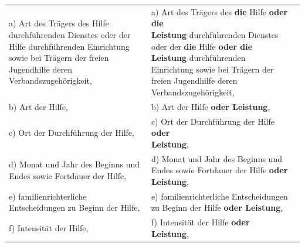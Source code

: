 \documentclass[10pt,a4paper,landscape]{article}
\begin{document}
\begin{longtable}{|L{8.2cm}|L{8.2cm}|L{8.2cm}|}
\hhline{|---|}
a)   \newline Art des Trägers des Hilfe durchführenden  \newline Dienstes oder der Hilfe durchführenden  \newline Einrichtung sowie bei Trägern der freien  \newline Jugendhilfe deren Verbandszugehörigkeit, & a)   \newline Art des Trägers des \textbf{\textcolor{diffred}{die}} Hilfe \textbf{\textcolor{diffred}{oder die  \newline Leistung}} durchführenden Dienstes oder  \newline der \textbf{\textcolor{diffred}{die}} Hilfe \textbf{\textcolor{diffred}{oder die Leistung}}  \newline durchführenden Einrichtung sowie bei  \newline Trägern der freien Jugendhilfe deren  \newline Verbandszugehörigkeit, &  \\
\hhline{|---|}
b)   \newline Art der Hilfe, & b)   \newline Art der Hilfe \textbf{\textcolor{diffred}{oder Leistung}}, &  \\
\hhline{|---|}
c)   \newline Ort der Durchführung der Hilfe, & c)   \newline Ort der Durchführung der Hilfe \textbf{\textcolor{diffred}{oder  \newline Leistung}}, &  \\
\hhline{|---|}
d)   \newline Monat und Jahr des Beginns und Endes  \newline sowie Fortdauer der Hilfe, & d)   \newline Monat und Jahr des Beginns und Endes  \newline sowie Fortdauer der Hilfe \textbf{\textcolor{diffred}{oder Leistung}}, &  \\
\hhline{|---|}
e)   \newline familienrichterliche Entscheidungen zu  \newline Beginn der Hilfe, & e)   \newline familienrichterliche Entscheidungen zu  \newline Beginn der Hilfe \textbf{\textcolor{diffred}{oder Leistung}}, &  \\
\hhline{|---|}
f)   \newline Intensität der Hilfe, & f)   \newline Intensität der Hilfe \textbf{\textcolor{diffred}{oder Leistung}}, &  \\

\end{longtable}
\end{document}
